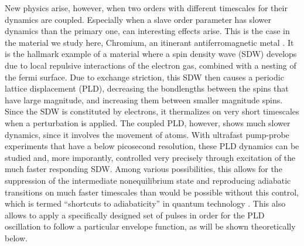 New physics arise, however, when two orders with different timescales for their dynamics are coupled.
Especially when a slave order parameter has slower dynamics than the primary one, can interesting effects arise.
This is the case in the material we study here, Chromium, an itinerant antiferromagnetic metal \cite{Kulikov1984,Fawcett1988}.
It is the hallmark example of a material where a spin density wave (SDW) develops due to local repulsive interactions of the electron gas, combined with a nesting of the fermi surface.
Due to exchange striction, this SDW then causes a periodic lattice displacement (PLD), decreasing the bondlengths between the spins that have large magnitude, and increasing them between smaller magnitude spins.
Since the SDW is constituted by electrons, it thermalizes on very short timescales when a perturbation is applied\cite{Nicholson2016}.
The coupled PLD, however, shows much slower dynamics, since it involves the movement of atoms.
With ultrafast pump-probe experiments that have a below picosecond resolution, these PLD dynamics can be studied and, more imporantly, controlled very precisely through excitation of the much faster responding SDW.
Among various possibilities, this allows for the suppression of the intermediate nonequilibrium state and reproducing adiabatic transitions on much faster timescales than would be possible without this control, which is termed ``shortcuts to adiabaticity'' in quantum technology \cite{Torrontegui2013,Deffner2014,Zhou2017}.
This also allows to apply a specifically designed set of pulses in order for the PLD oscillation to follow a particular envelope function, as will be shown theoretically below.


